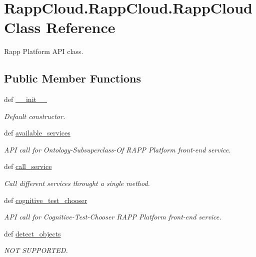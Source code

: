 \hypertarget{classRappCloud_1_1RappCloud_1_1RappCloud}{\section{Rapp\-Cloud.\-Rapp\-Cloud.\-Rapp\-Cloud Class Reference}
\label{classRappCloud_1_1RappCloud_1_1RappCloud}
}


Rapp Platform A\-P\-I class.  


\subsection*{Public Member Functions}
\begin{DoxyCompactItemize}
\item 
def \hyperlink{classRappCloud_1_1RappCloud_1_1RappCloud_aa3170142dc12a575b87c036246cabe10}{\-\_\-\-\_\-init\-\_\-\-\_\-}
\begin{DoxyCompactList}\small\item\em Default constructor. \end{DoxyCompactList}\item 
def \hyperlink{classRappCloud_1_1RappCloud_1_1RappCloud_a265179658383582052a2da99fc27643b}{available\-\_\-services}
\begin{DoxyCompactList}\small\item\em A\-P\-I call for Ontology-\/\-Subsuperclass-\/\-Of R\-A\-P\-P Platform front-\/end service. \end{DoxyCompactList}\item 
def \hyperlink{classRappCloud_1_1RappCloud_1_1RappCloud_af7e5ca28a797737da3f26d1fe88c9b45}{call\-\_\-service}
\begin{DoxyCompactList}\small\item\em Call different services throught a single method. \end{DoxyCompactList}\item 
def \hyperlink{classRappCloud_1_1RappCloud_1_1RappCloud_a029c05ed6a8c461203d754267d56d3d4}{cognitive\-\_\-test\-\_\-chooser}
\begin{DoxyCompactList}\small\item\em A\-P\-I call for Cognitive-\/\-Test-\/\-Chooser R\-A\-P\-P Platform front-\/end service. \end{DoxyCompactList}\item 
def \hyperlink{classRappCloud_1_1RappCloud_1_1RappCloud_a5c2b6941020f07d435f07a5a7b10517d}{detect\-\_\-objects}
\begin{DoxyCompactList}\small\item\em N\-O\-T S\-U\-P\-P\-O\-R\-T\-E\-D. \end{DoxyCompactList}\item 

\end{DoxyCompactItemize}
